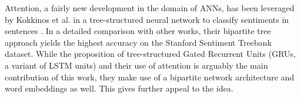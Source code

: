 Attention, a fairly new development in the domain of ANNs, has been leveraged by Kokkinos et al. in a tree-structured neural network to classify sentiments in sentences \cite{kokkinos2017structural}. In a detailed comparison with other works, their bipartite tree approach yields the highest accuracy on the Stanford Sentiment Treebank dataset. While the proposition of tree-structured Gated Recurrent Units (GRUs, a variant of LSTM units) and their use of attention is arguably the main contribution of this work, they make use of a bipartite network architecture and word embeddings as well. This gives further appeal to the idea.